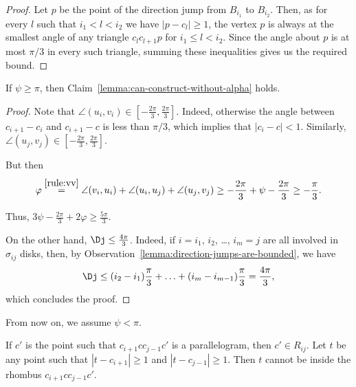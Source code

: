 \begin{enumerate}[label={\bf Case \arabic*: }, wide, labelwidth=!, labelindent=0pt]
\begin{proof}
Let $p$ be the point of the direction jump from $B_{i_1}$ to $B_{i_2}$. Then, as for every $l$ such that $i_1 < l < i_2$ we have $|p - c_l|\geq 1$, the vertex $p$ is always at the smallest angle of any triangle $c_lc_{l+1}p$ for $i_1\leq l < i_2$. Since the angle about $p$ is at most $\pi/3$ in every such triangle, summing these inequalities gives us the required bound.
\end{proof}

\begin{observation}
If $\psi\geq\pi$, then Claim~\ref{lemma:can-construct-without-alpha} holds.
\end{observation}

\begin{proof}
Note that $\angle(u_i, v_i)\in\left[-\frac{2\pi}{3}, \frac{2\pi}{3}\right]$. Indeed, otherwise the angle between $c_{i+1} - c_i$ and $c_{i+1} - c$ is less than $\pi/3$, which implies that $|c_i - c| < 1$. Similarly, $\angle(u_j, v_j)\in\left[-\frac{2\pi}{3}, \frac{2\pi}{3}\right]$.

But then
$$\varphi \stackrel{\ref{rule:vv}}{=} \angle(v_i, u_i) + \angle(u_i, u_j) + \angle(u_j, v_j) \geq -\frac{2\pi}{3} + \psi - \frac{2\pi}{3} \geq -\frac{\pi}{3}.$$

Thus,
$3\psi - \frac{2\pi}{3} + 2\varphi\geq \frac{5\pi}{3}.$

On the other hand, $\Dj\leq\frac{4\pi}{3}$. Indeed, if $i = i_1$, $i_2$, \ldots, $i_m = j$ are all involved in $\sigma_{ij}$ disks, then, by Observation~\ref{lemma:direction-jumps-are-bounded}, we have $$\Dj\leq(i_2 - i_1)\frac{\pi}{3} + \ldots + (i_m - i_{m-1})\frac{\pi}{3} = \frac{4\pi}{3},$$
which concludes the proof.
\end{proof}

From now on, we assume $\psi < \pi$.

\begin{observation} \label{lemma:inside-the-rhombus}
If $c'$ is the point such that $c_{i+1}cc_{j-1}c'$ is a parallelogram, then $c'\in R_{ij}$. Let $t$ be any point such that $|t - c_{i+1}|\geq 1$ and $|t - c_{j-1}| \geq 1$. Then $t$ cannot be inside the rhombus $c_{i+1}cc_{j-1}c'$.
\end{observation}


\end{enumerate}
